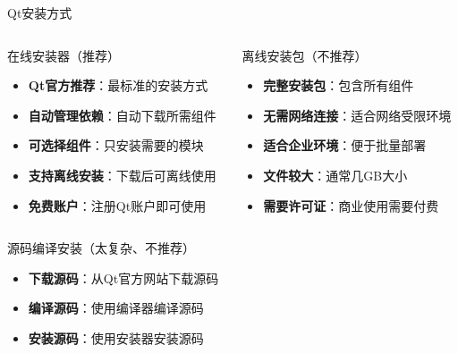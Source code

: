 \documentclass[UTF8,aspectratio=169]{beamer}
\begin{document}
\begin{frame}{Qt安装方式}
    \begin{columns}
        \begin{column}{0.48\textwidth}
            \begin{ytublock}{在线安装器（推荐）}
                \begin{itemize}
                    \item \textbf{Qt官方推荐}：最标准的安装方式
                    \item \textbf{自动管理依赖}：自动下载所需组件
                    \item \textbf{可选择组件}：只安装需要的模块
                    \item \textbf{支持离线安装}：下载后可离线使用
                    \item \textbf{免费账户}：注册Qt账户即可使用
                \end{itemize}
            \end{ytublock}
        \end{column}
        \hspace{0.02\textwidth}
        \begin{column}{0.48\textwidth}
            \begin{ytublock}{离线安装包（不推荐）}
                \begin{itemize}
                    \item \textbf{完整安装包}：包含所有组件
                    \item \textbf{无需网络连接}：适合网络受限环境
                    \item \textbf{适合企业环境}：便于批量部署
                    \item \textbf{文件较大}：通常几GB大小
                    \item \textbf{需要许可证}：商业使用需要付费
                \end{itemize}
            \end{ytublock}
        \end{column}
    \end{columns}
    \begin{ytublock}{源码编译安装（太复杂、不推荐）}
        \begin{itemize}
            \item \textbf{下载源码}：从Qt官方网站下载源码
            \item \textbf{编译源码}：使用编译器编译源码
            \item \textbf{安装源码}：使用安装器安装源码
        \end{itemize}
    \end{ytublock}
\end{frame}
\end{document}
